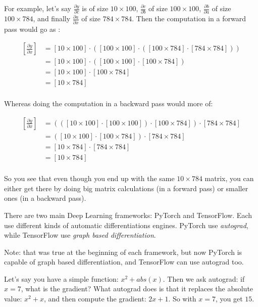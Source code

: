 \documentclass{article}
\theoremstyle{problemstyle}
\begin{document}
For example, let's say $  \frac{\partial y}{\partial c} $ is of size $ 10 \times 100$, $ \frac{\partial c}{\partial b} $ of size $ 100 \times 100$, $  \frac{\partial b}{\partial a} $ of size $ 100 \times 784$, and finally $ \frac{\partial a}{\partial x} $ of size $ 784 \times 784 $. 
Then the computation in a forward pass would go as :

\begin{align*}
  \left[ \frac{\partial y}{\partial x} \right] &= [10 \times 100] \cdot \left( [100 \times 100] \cdot \left( [100 \times 784] \cdot [784 \times 784] \right) \right) \\ 
  &= [10 \times 100] \cdot \left( [100 \times 100] \cdot [100 \times  784] \right) \\ 
  &= [10 \times 100] \cdot [100 \times  784] \\ 
  &= [10 \times 784] \\ 
\end{align*}

Whereas doing the computation in a backward pass would more of:

\begin{align*}
  \left[ \frac{\partial y}{\partial x} \right] &= \left( \left(  [10 \times 100] \cdot [100 \times 100] \right) \cdot [100 \times 784] \right) \cdot [784 \times 784] \\ 
  &= \left(  [10 \times 100] \cdot [100 \times 784] \right) \cdot [784 \times 784] \\ 
  &= [10 \times 784] \cdot [784 \times 784] \\ 
  &= [10 \times 784] \\ 
\end{align*}

So you see that even though you end up with the same $10 \times 784$ matrix, you can either get there by doing big matrix calculations (in a forward pass) or smaller ones (in a backward pass).

There are two main Deep Learning frameworks: PyTorch and TensorFlow. Each use different kinds of automatic differentiations engines. PyTorch use \emph{autograd}, while TensorFlow use \emph{graph based differentiation}. 

Note: that was true at the beginning of each framework, but now PyTorch is capable of graph based differentiation, and TensorFlow can use autograd too. 

Let's say you have a simple function: $x^2 + abs(x)$. Then we ask autograd: if $x=7$, what is the gradient? What autograd does is that it replaces the absolute value: $x^2 + x$, and then compute the gradient: $2x + 1$. So with $x=7$, you get $15$.
\end{document}
